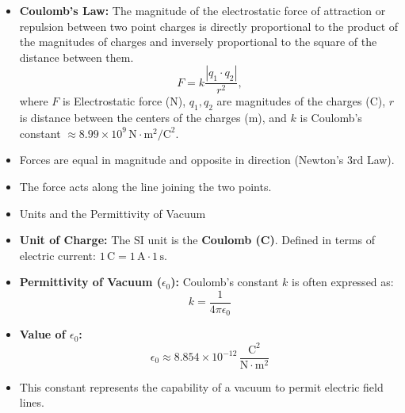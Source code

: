 \documentclass[t,aspectratio=169]{beamer}
\begin{document}
\begin{frame}
\begin{itemize}
\begin{columns}
\end{columns}



\pagebreak
\item \textbf{Coulomb's Law:} The magnitude of the electrostatic force of attraction or repulsion between two point charges is directly proportional to the product of the magnitudes of charges and inversely proportional to the square of the distance between them.
$$ F = k \frac{|q_1 \cdot q_2|}{r^2}, $$
where $F$ is Electrostatic force (N), $q_1, q_2$ are magnitudes of the charges (C), $r$ is distance between the centers of the charges (m), and $k$ is Coulomb's constant $\approx 8.99 \times 10^9 \, \text{N}\cdot\text{m}^2/\text{C}^2$. 

    \begin{center}
\end {center}
    
\item Forces are equal in magnitude and opposite in direction (Newton's 3rd Law).
\item The force acts along the line joining the two points.


\pagebreak
\item Units and the Permittivity of Vacuum
\item \textbf{Unit of Charge:} The SI unit is the \textbf{Coulomb (C)}. Defined in terms of electric current: $1\,\text{C} = 1\,\text{A} \cdot 1\,\text{s}$.
\item \textbf{Permittivity of Vacuum ($\epsilon_0$):} Coulomb's constant $k$ is often expressed as:
$$ k = \frac{1}{4\pi\epsilon_0} $$
\item \textbf{Value of $\epsilon_0$:}
$$\epsilon_0 \approx 8.854 \times 10^{-12} \, \frac{\text{C}^2}{\text{N}\cdot\text{m}^2} $$
\item This constant represents the capability of a vacuum to permit electric field lines.

\end{itemize}
      
\end{frame}
\end{document}
